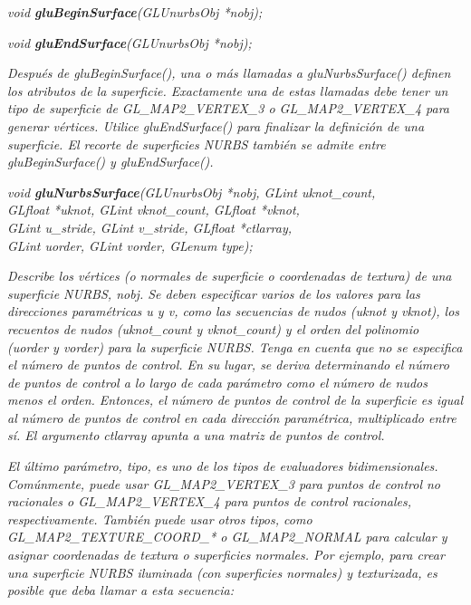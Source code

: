 \documentclass[]{article}
\begin{document}
\begin{description}
    \item \emph{void \textbf{gluBeginSurface}(GLUnurbsObj *nobj);}
    \item \emph{void \textbf{gluEndSurface}(GLUnurbsObj *nobj);}
    \begin{description}
        \item \textit{Después de gluBeginSurface(), una o más llamadas a gluNurbsSurface() definen los atributos de la superficie. Exactamente una de estas llamadas debe tener un tipo de superficie de GL\_MAP2\_VERTEX\_3 o GL\_MAP2\_VERTEX\_4 para generar vértices. Utilice gluEndSurface() para finalizar la definición de una superficie. El recorte de superficies NURBS también se admite entre gluBeginSurface() y gluEndSurface().
        }
    \end{description}
    \item \emph{void \textbf{gluNurbsSurface}(GLUnurbsObj *nobj, GLint uknot\_count,\\
    GLfloat *uknot, GLint vknot\_count, GLfloat *vknot,\\
    GLint u\_stride, GLint v\_stride, GLfloat *ctlarray,\\
    GLint uorder, GLint vorder, GLenum type);}
    \begin{description}
        \item \textit{Describe los vértices (o normales de superficie o coordenadas de textura) de una superficie NURBS, nobj. Se deben especificar varios de los valores para las direcciones paramétricas u y v, como las secuencias de nudos (uknot y vknot), los recuentos de nudos (uknot\_count y vknot\_count) y el orden del polinomio (uorder y vorder) para la superficie NURBS. Tenga en cuenta que no se especifica el número de puntos de control. En su lugar, se deriva determinando el número de puntos de control a lo largo de cada parámetro como el número de nudos menos el orden. Entonces, el número de puntos de control de la superficie es igual al número de puntos de control en cada dirección paramétrica, multiplicado entre sí. El argumento ctlarray apunta a una matriz de puntos de control.
        }
        \item \textit{El último parámetro, tipo, es uno de los tipos de evaluadores bidimensionales. Comúnmente, puede usar GL\_MAP2\_VERTEX\_3 para puntos de control no racionales o GL\_MAP2\_VERTEX\_4 para puntos de control racionales, respectivamente. También puede usar otros tipos, como GL\_MAP2\_TEXTURE\_COORD\_* o GL\_MAP2\_NORMAL para calcular y asignar coordenadas de textura o superficies normales. Por ejemplo, para crear una superficie NURBS iluminada (con superficies normales) y texturizada, es posible que deba llamar a esta secuencia:
}
\end{description}
\end{description}
\end{document}
